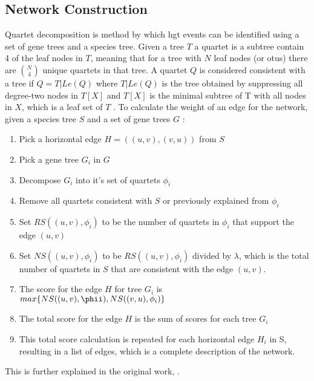 \subsection*{Network Construction}
Quartet decomposition is method by which \ac{hgt} events can be identified using a set of gene trees and a species tree.
Given a tree $T$ a quartet is a subtree contain 4 of the leaf nodes in $T$, meaning that for a tree with $N$ leaf nodes (or \ac{otu}s) there are $\binom{N}{4}$ unique quartets in that tree.
A quartet $Q$ is considered consistent with a tree if $Q = T|Le(Q)$ where $T|Le(Q)$ is the tree obtained by suppressing all degree-two nodes in $T[X]$ and $T[X]$ is the minimal subtree of T with all nodes in $X$, which is a leaf set of $T$ \citep{hide}.
To calculate the weight of an edge for the network, given a species tree $S$ and a set of gene trees $G$ \citep{hide}:
\begin{enumerate}
    \item Pick a horizontal edge $H = ((u,v),(v,u))$ from $S$
    \item Pick a gene tree $G_i$ in $G$
    \item Decompose $G_i$ into it's set of quartets $\phi_i$
    \item Remove all quartets consistent with $S$ or previously explained from $\phi_i$
    \item Set $RS((u,v),\phi_i)$ to be the number of quartets in $\phi_i$ that support the edge $(u,v)$
    \item Set $NS((u,v),\phi_i)$ to be $RS((u,v),\phi_i)$ divided by $\lambda$, which is the total number of quartets in $S$ that are consistent with the edge $(u,v)$.
    \item The score for the edge $H$ for tree $G_i$ is $max\{NS((u,v),\phii),NS((v,u),\phi_i)\}$
    \item The total score for the edge $H$ is the sum of scores for each tree $G_i$
    \item This total score calculation is repeated for each horizontal edge $H_i$ in S, resulting in a list of edges, which is a complete description of the network.
\end{enumerate}
This is further explained in the original work, \citep{hide}.
